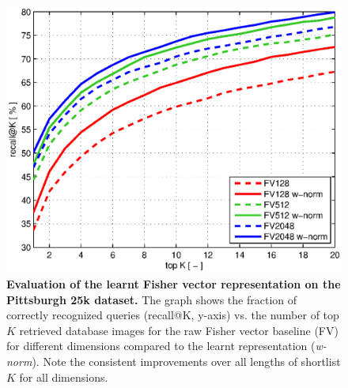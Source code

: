     \begin{figure}[tbp]
        \centering
        \includegraphics[width=1\linewidth]{imgs/plotPitt25kNoBOW}  
        \vspace*{-7mm}
        \caption{
            \textbf{Evaluation of the learnt Fisher vector representation on the Pittsburgh 25k \cite{Gronat13} dataset.} 
            The graph shows the fraction of correctly recognized queries (recall@K, y-axis) vs. the number of top $K$ retrieved database images for the raw Fisher vector baseline (FV) for different dimensions compared to the learnt representation (\emph{w-norm}). Note the consistent improvements over all lengths of shortlist $K$ for all dimensions.
        }
        \label{fig:recall}
    \end{figure}

